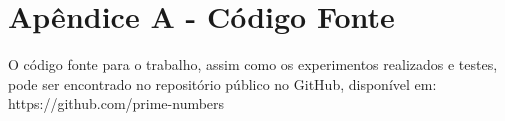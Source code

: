 \documentclass[a4paper, 11pt]{article}
\begin{document}


\printbibliography

\appendix
\section{Apêndice A - Código Fonte}
\label{app-a}

O código fonte para o trabalho, assim como os experimentos realizados e testes, pode ser encontrado no repositório público no GitHub, disponível em: https://github.com/prime-numbers
\end{document}
